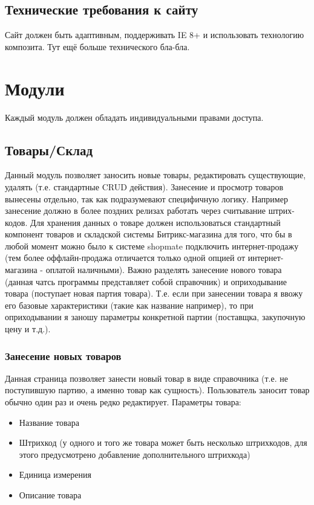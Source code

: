 \documentclass[DIV=calc, paper=a4, fontsize=11pt]{scrartcl} %
\begin{document}
\subsection{Технические требования к сайту}
Сайт должен быть адаптивным, поддерживать IE 8+ и использовать технологию композита.
Тут ещё больше технического бла-бла.


\section{Модули}

Каждый модуль должен обладать индивидуальными правами доступа.

\subsection{Товары/Склад}

Данный модуль позволяет заносить новые товары, редактировать существующие, удалять (т.е. стандартные CRUD действия). Занесение и просмотр товаров вынесены отдельно, так как подразумевают специфичную логику. Например занесение должно в более поздних релизах работать через считывание штрих-кодов. Для хранения данных о товаре должен использоваться стандартный компонент товаров и складской системы Битрикс-магазина для того, что бы в любой момент можно было к системе shopmate подключить интернет-продажу (тем более оффлайн-продажа отличается только одной опцией от интернет-магазина - оплатой наличными). Важно разделять занесение нового товара (данная чатсь программы представляет собой справочник) и оприходывание товара (поступает новая партия товара). Т.е. если при занесении товара я ввожу его базовые характеристики (такие как название например), то при оприходывании я заношу параметры конкретной партии (поставщка, закупочную цену и т.д.).

\subsubsection{Занесение новых товаров} \label{subsubsec:new_goods}

Данная страница позволяет занести новый товар в виде справочника (т.е. не поступившую партию, а именно товар как сущность). Пользователь заносит товар обычно один раз и очень редко редактирует. Параметры товара:
\begin{itemize}
	\item Название товара
	\item Штрихкод (у одного и того же товара может быть несколько штрихкодов, для этого предусмотрено добавление дополнительного штрихкода)
	\item Единица измерения
	\item Описание товара
\end{itemize}
\end{document}
